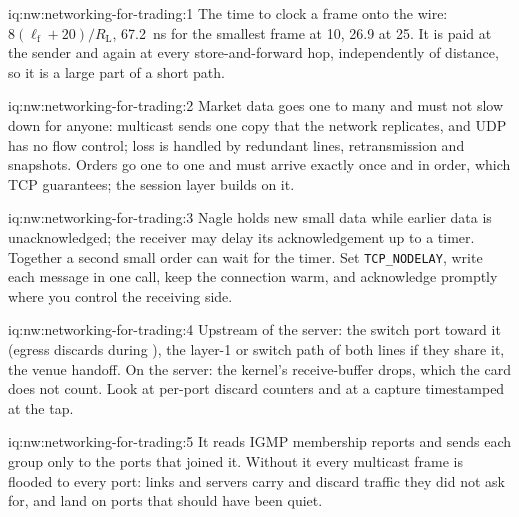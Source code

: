 \begin{solution}{iq:nw:networking-for-trading:1}
The time to clock a frame onto the wire: $8(\ell_{\mathrm f}+20)/R_{\mathrm L}$, 67.2~ns for the smallest frame at 10, 26.9 at
25. It is paid at the sender and again at every store-and-forward hop, independently of distance, so it is a large part of a
short path.
\end{solution}

\begin{solution}{iq:nw:networking-for-trading:2}
Market data goes one to many and must not slow down for anyone: multicast sends one copy that the network replicates, and UDP
has no flow control; loss is handled by redundant lines, retransmission and snapshots. Orders go one to one and must arrive
exactly once and in order, which TCP guarantees; the session layer builds on it.
\end{solution}

\begin{solution}{iq:nw:networking-for-trading:3}
Nagle holds new small data while earlier data is unacknowledged; the receiver may delay its acknowledgement up to a timer. Together
a second small order can wait for the timer. Set \texttt{TCP\_NODELAY}, write each message in one call, keep the connection warm,
and acknowledge promptly where you control the receiving side.
\end{solution}

\begin{solution}{iq:nw:networking-for-trading:4}
Upstream of the server: the switch port toward it (egress discards during ), the layer-1 or switch path of both lines
if they share it, the venue handoff. On the server: the kernel's receive-buffer drops, which the card does not count. Look at
per-port discard counters and at a capture timestamped at the tap.
\end{solution}

\begin{solution}{iq:nw:networking-for-trading:5}
It reads IGMP membership reports and sends each group only to the ports that joined it. Without it every multicast frame is
flooded to every port: links and servers carry and discard traffic they did not ask for, and  land on ports that
should have been quiet.
\end{solution}

